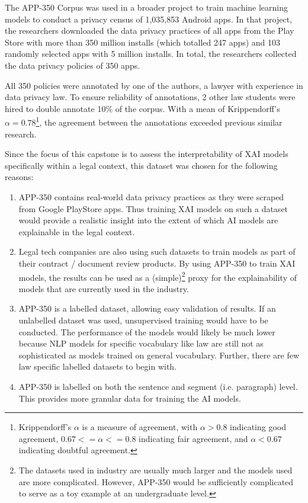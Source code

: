 The APP-350 Corpus was used in a broader project to train machine learning models to conduct a privacy census of 1,035,853 Android apps. In that project, the researchers downloaded the data privacy practices of all apps from the Play Store with more than 350 million installs (which totalled 247 apps) and 103 randomly selected apps with 5 million installs. In total, the researchers collected the data privacy policies of 350 apps.

All 350 policies were annotated by one of the authors, a lawyer with experience in data privacy law. To ensure reliability of annotations, 2 other law students were hired to double annotate 10\% of the corpus. With a mean of Krippendorff's $\alpha = 0.78$\footnote{Krippendorff's $\alpha$ is a measure of agreement, with $\alpha > 0.8$ indicating good agreement, $0.67 <= \alpha <= 0.8$ indicating fair agreement, and $\alpha < 0.67$ indicating doubtful agreement.}, the agreement between the annotations exceeded previous similar research.

Since the focus of this capstone is to assess the interpretability of XAI models specifically within a legal context, this dataset was chosen for the following reasons:
\begin{enumerate}
	\item APP-350 contains real-world data privacy practices as they were scraped from Google PlayStore apps. Thus training XAI models on such a dataset would provide a realistic insight into the extent of which AI models are explainable in the legal context.
	\item Legal tech companies are also using such datasets to train models as part of their contract / document review products. By using APP-350 to train XAI models, the results can be used as a (simple)\footnote{The datasets used in industry are usually much larger and the models used are more complicated. However, APP-350 would be sufficiently complicated to serve as a toy example at an undergraduate level.} proxy for the explainability of models that are currently used in the industry.
	\item APP-350 is a labelled dataset, allowing easy validation of results. If an unlabelled dataset was used, unsupervised training would have to be conducted. The performance of the models would likely be much lower because NLP models for specific vocabulary like law are still not as sophisticated as models trained on general vocabulary. Further, there are few law specific labelled datasets to begin with. 
	\item APP-350 is labelled on both the sentence and segment (i.e. paragraph) level. This provides more granular data for training the AI models. 
\end{enumerate}


